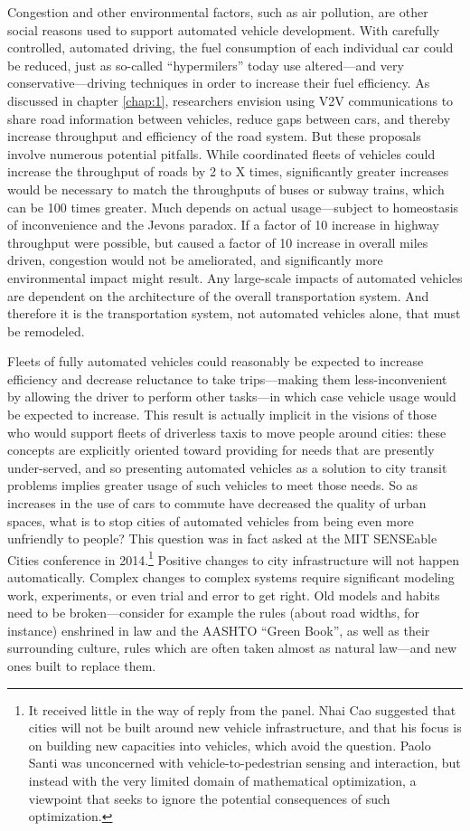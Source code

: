 Congestion and other environmental factors, such as air pollution, are
other social reasons used to support automated vehicle development.
With carefully controlled, automated driving, the fuel consumption of each
individual car could be reduced, just as so-called ``hypermilers''
today use altered---and very conservative---driving techniques in
order to increase their fuel efficiency.\cite{???} As discussed in
chapter \ref{chap:1}, researchers envision using V2V communications to
share road information between vehicles, reduce gaps between cars, and
thereby increase throughput and efficiency of the road system. But
these proposals involve numerous potential pitfalls. While coordinated
fleets of vehicles could increase the throughput of roads by 2 to X
times, significantly greater increases would be necessary to match the
throughputs of buses or subway trains, which can be 100 times
greater.\cite{???-kemp} Much depends on actual usage---subject to
homeostasis of inconvenience and the Jevons paradox. If a factor of 10
increase in highway throughput were possible, but caused a factor of
10 increase in overall miles driven, congestion would not be
ameliorated, and significantly more environmental impact might result. Any
large-scale impacts of automated vehicles are dependent on the
architecture of the overall transportation system. And therefore it is
the transportation system, not automated vehicles alone, that must be remodeled.

Fleets of fully automated vehicles could reasonably be expected to increase
efficiency and decrease reluctance to take trips---making them
less-inconvenient by allowing the driver to perform other tasks---in
which case vehicle usage would be expected to increase. This result is actually
implicit in the visions of those who would support fleets of
driverless taxis to move people around cities:  these concepts are
explicitly oriented toward providing for needs that are presently
under-served, and so presenting automated vehicles as a solution to
city transit problems implies greater usage of such vehicles to meet
those needs. So as increases in the use of cars to commute have
decreased the quality of urban spaces, what is to stop cities of
automated vehicles from
being even more unfriendly to
people? This question was in fact asked at the MIT SENSEable Cities
conference in 2014.\footnote{It received little in the way of reply from the
panel. Nhai Cao suggested that cities will not be built around new
vehicle infrastructure, and that his focus is on building new
capacities into vehicles, which avoid the question. Paolo Santi was
unconcerned with vehicle-to-pedestrian sensing and interaction, but
instead with the very limited domain of mathematical optimization,
a viewpoint that seeks to ignore the potential consequences of such
optimization.} Positive changes to city infrastructure will not happen
automatically. Complex
changes to complex systems require significant modeling work,
experiments, or even trial and error to get right. Old models and
habits need to be broken---consider for example the rules (about road
widths, for instance) enshrined in law and the AASHTO ``Green Book'', as well as their
surrounding culture, rules which are often taken almost as natural
law\cite{???-kemp}---and new ones built to replace them. 

